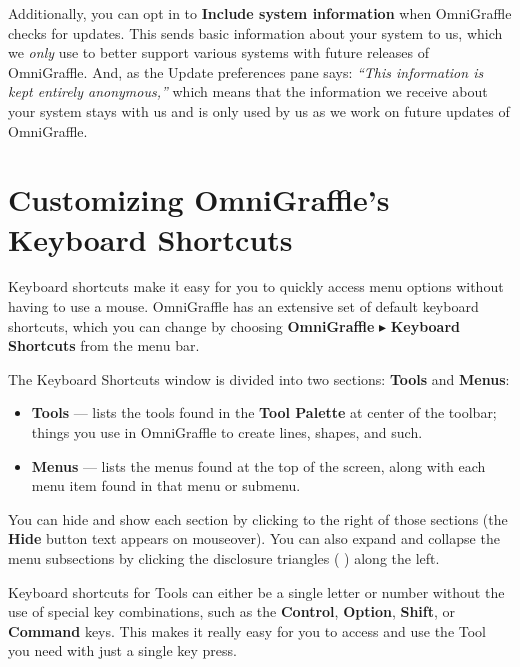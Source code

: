 \documentclass[../main.tex]{subfiles}
\begin{document}

Additionally, you can opt in to \textbf{Include system information} when OmniGraffle checks for
updates. This sends basic information about your system to us, which we \textit{only} use to
better support various systems with future releases of OmniGraffle. And, as the Update
preferences pane says: \textit{``This information is kept entirely anonymous,''} which means
that the information we receive about your system stays with us and is only used by us as we
work on future updates of OmniGraffle.

\section{Customizing OmniGraffle's Keyboard Shortcuts}

Keyboard shortcuts make it easy for you to quickly access menu options without having to use a
mouse. OmniGraffle has an extensive set of default keyboard shortcuts, which you can change by
choosing \textbf{OmniGraffle} $\blacktriangleright$ \textbf{Keyboard Shortcuts} from the menu
bar.


The Keyboard Shortcuts window is divided into two sections: \textbf{Tools} and \textbf{Menus}:

\begin{itemize}
  \item \textbf{Tools} --- lists the tools found in the \textbf{Tool Palette} at center of the
    toolbar; things you use in OmniGraffle to create lines, shapes, and such.
  \item \textbf{Menus} --- lists the menus found at the top of the screen, along with each menu
    item found in that menu or submenu.
\end{itemize}

You can hide and show each section by clicking to the right of those sections (the \textbf{Hide}
button text appears on mouseover). You can also expand and collapse the menu subsections by
clicking the disclosure triangles (
) along the left.

Keyboard shortcuts for Tools can either be a single letter or number without the use of special
key combinations, such as the \textbf{Control}, \textbf{Option}, \textbf{Shift}, or
\textbf{Command} keys. This makes it really easy for you to access and use the Tool you need
with just a single key press.
\end{document}
